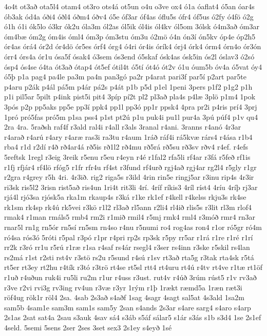 {4o4t
ot3að
ota5l4
otam4
ot3ro
ots4á
ot5un
o4u
o3ve
ox4
ó1a
óaflat4
ó5an
óar4s
ób3ak
ód4a
óði4
óðl4
óðm4
óðv4
ó5e
óf3ar
óf4as
óflu5s
ófr4
óf5us
ó2fy
ó4fö
ó2g
ó1h
ó1i
ók5lo
ó3kr
ók2u
óla3m
ól2as
ól5ik
ól4is
ól4kv
ól5om
3ólsk
ó4m3að
óm3ar
óm4bæ
óm2g
óm4is
óml4
óm3p
óm3stu
óm3u
ó2mö
ó4n
ón3í
ón5kv
óp4e
óp2h5
ór4as
órá4
ór2d
ór4dö
ór5es
órf4
órg4
ó4ri
ór4is
órík4
órj4
órk4
órm4
órn4o
ór3ón
órr4
órs4a
ór1u
ósa5f
ósak4
ó3sem
ós3end
ó5skaf
ósk4as
ósk5in
ós2l
óslav3
ó2só
ósp4
ós4se
ó4ta
ót3að
ótap4
ót5ef
ótil4t
ó5tí
ót4ó
ót2v
ó1u
óum5b
óv4a
ó5vat
óy4
ó5þ
p1a
pag4
pa4le
pa3m
pa4n
pan3gó
pa2r
p4arat
pari3f
par5í
p2art
par5te
p4aru
p2ák
p4ál
pá5m
p4ár
pá2s
p4át
p1b
p5d
p1el
1peni
3pers
p1f2
p1g2
p1h
p1i
pil5ar
5pilt
p4ink
pist5i
pit4
3píp
pí2t
pl2
pl3að
pla4s
p4læ
3plö
p1m4
1pok
3pós
p2p
pp5aks
pp5e
pp3í
ppk4
pp1l
pp3ó
pp1r
ppsk4
4pra
pr2i
p4ris
prí4
3prj
1pró
pró5fas
pró5m
p1sa
pss4
p1st
pt2ú
p1u
puk4i
pu1l
pur4a
3pú
púf4
p1v
qu4
2ra
4ra.
5raðsh
raf4f
r3ald
ral4i
r4all
r3als
3ranal
r4ani.
3ranns
r4anó
4r3ar
r4arað
r4arú
r4ary
r4aræ
ras3i
ra3tu
r4aum
1ráð
ráf4i
rá5kvæ
rárs4
r4ása
r1b4
rba4
r1d
r2dí
r4ð
rð4ar4á
rð5is
rð1l2
rð4mu
rð5rá
rð5su
rð3sv
rðv4
r4ef.
r4efs
5reftsk
1regl
r3eig
3reik
r5enu
r5eu
r4eyn
r4é
r1fal2
rfa5li
rf4ar
r3fá
r5feð
rf1is
r1fj
rfjár4
rf4lö
rfóg5
r1fr
rfr4u
rf4st
r3fund
rf4urð
rgj4að
rgj4ar
rg2l4
r5gly
r1gr
r2gra
r4grey
r5h
4ri.
4r3ið.
rig2
riga5s
r3ild
4rin
rin5e
ringj5ar
r3inu
rip4s
4r3ir
ri3sk
ris5l2
3risn
rist5að
ris4un
1ri4t
rit3li
4rí.
4ríf
ríkis3
4ríl
ríst4
4ríu
4ríþ
rj3ar
rjá4l
rjó3sa
rjósk5a
rka1m
rkaup4s
r3ká
r1ke
rk1ef
r4kell
r4kelss
rkju3s
rk4se
rk1sm
rk4sp
rk4ú
rk5vei
r3kö
r1l2
rl3að
rl5ann
r2li4
rl4ið
rlis5s
r3lit
rl3m
rlof4
rmak4
r1man
rmáls5
rmb4
rm2i
r1mið
rmil4
r5mj
rmk4
rml4
r3móð
rmr4
rn3ar
rnar5l
rn1g
rn5ór
rn5sí
rn5sm
rn4so
r4nu
r5numi
ro4
rog4as
ron4
r1or
ró5gr
ró4m
ró4sa
rós3ó
5róti
r5pal
r3pó
r1pr
r4pri
rp2s
rp3sk
r5py
rr5ar
r1rá
r1re
r1ré
r1rí
rr2k
r3ró
rr1u
r5rú
r1ræ
r1sa
r4saf
rs4ár
rsegl4
r3ser
rs4inn
r3ske
r5skil
rs4lan
rs2má
r1st
r2sti
rst4v
r3stö
rs2u
r5sund
r4sú
r1sv
rt3að
rta5g
r3tak
rta4sk
r5tá
rt5er
rt3ey
rt2hu
r4tík
r3tó
r3trö
rt4se
rt5sl
rtt4
rt4uru
rt4ú
r4tv
rt4ve
r1tæ
rt1öf
r1uð
r4uðun
ruk4i
ru5li
ru2m
r1ur
r4uss
r3ust.
rut4v
r4úð
3rúm
rúst5
r1v
rv3að
r3ve
r2vi
rvi3g
rv3ing
rv4un
r3væ
r3yr
1rým
r1þ
1rækt
ræmd5a
1ræn
ræt3i
röf4ug
rök1r
röl4
2sa.
4sab
2s3að
s4aðf
1sag
4sagr
4sagt
sal5at
4s3ald
1sa2m
sam5b
4sam1e
sam3m
sam1s
sam5y
2san
s4ands
2s3ar
s4are
sarg4
s4aro
s4arp
2s1as
2sat
sat4a
2sau
s3auk
4sav
sá4
s3áb
s5áf
sálar5
s1ár
s3ás
s1b
s3d4
1se
2s1ef
4seld.
5semi
5sens
2ser
2ses
3set
sex3
2s1ey
s4eyð
1sé
}
